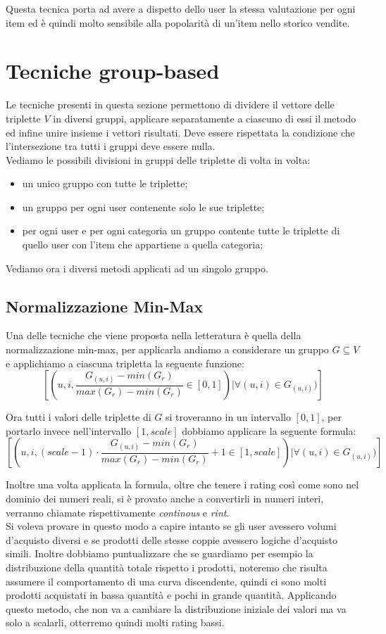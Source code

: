 Questa tecnica porta ad avere a dispetto dello user la stessa valutazione per ogni item ed è quindi molto sensibile alla popolarità di un'item nello storico vendite.

\section{Tecniche group-based}
Le tecniche presenti in questa sezione permettono di dividere il vettore delle triplette $V$ in diversi gruppi, applicare separatamente a ciascuno di essi il metodo ed infine unire insieme i vettori risultati. 
Deve essere rispettata la condizione che l'intersezione tra tutti i gruppi deve essere nulla.\\
Vediamo le possibili divisioni in gruppi delle triplette di volta in volta:
\begin{itemize}
    \item un unico gruppo con tutte le triplette;
    \item un gruppo per ogni user contenente solo le sue triplette;
    \item per ogni user e per ogni categoria un gruppo contente tutte le triplette di quello user con l'item che appartiene a quella categoria;
\end{itemize}

Vediamo ora i diversi metodi applicati ad un singolo gruppo.
\subsection{Normalizzazione Min-Max}
Una delle tecniche che viene proposta nella letteratura è quella della normalizzazione min-max, per applicarla andiamo a considerare un gruppo $G \subseteq V$ e applichiamo a ciascuna tripletta la seguente funzione:
$$[(u, i, \frac{G_{(u,i)} - min(G_r)}{max(G_r) - min(G_r)} \in [0,1]) |  \forall (u,i) \in G_{(u,i)})]$$

Ora tutti i valori delle triplette di $G$ si troveranno in un intervallo $[0,1]$, per portarlo invece nell'intervallo $[1,scale]$ dobbiamo applicare la seguente formula:
$$[(u, i, (scale -1) \cdot \frac{G_{(u,i)} - min(G_r)}{max(G_r) - min(G_r)} + 1 \in [1,scale]) |  \forall (u,i) \in G_{(u,i)})]$$

Inoltre una volta applicata la formula, oltre che tenere i rating così come sono nel dominio dei numeri reali, si è provato anche a convertirli in numeri interi, verranno chiamate rispettivamente \textit{continous} e \textit{rint}.\\
Si voleva provare in questo modo a capire intanto se gli user avessero volumi d'acquisto diversi e se prodotti delle stesse coppie avessero logiche d'acquisto simili. 
Inoltre dobbiamo puntualizzare che se guardiamo per esempio la distribuzione della quantità totale rispetto i prodotti, noteremo che risulta assumere il comportamento di una curva discendente, quindi ci sono molti prodotti acquistati in bassa quantità e pochi in grande quantità. Applicando questo metodo, che non va a cambiare la distribuzione iniziale dei valori ma va solo a scalarli, otterremo quindi molti rating bassi.

